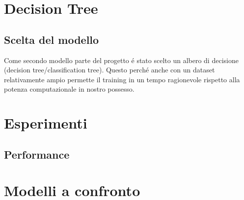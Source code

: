 \section{Decision Tree} \subsection{Scelta del modello} Come secondo
modello parte del progetto é stato scelto un albero di decisione
(decision tree/classification tree). Questo perché anche con un
dataset relativamente ampio permette il training in un tempo
ragionevole rispetto alla potenza computazionale in nostro possesso.

\section{Esperimenti}
\subsection{Performance}
\section{Modelli a confronto}

